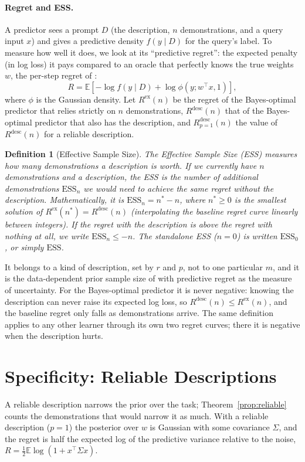 \documentclass{article}
\newtheorem{definition}{Definition}
\newcommand{\ess}{\mathrm{ESS}}
\newcommand{\E}{\mathbb{E}}
\begin{document}
\paragraph{Regret and ESS.}
A predictor sees a prompt $D$ (the description, $n$ demonstrations, and a query input $x$) and gives a predictive density $f(y \mid D)$ for the query's label. To measure how well it does, we look at its ``predictive regret'': the expected penalty (in log loss) it pays compared to an oracle that perfectly knows the true weights $w$, the per-step regret of \citet{genewein2025}:
\begin{equation}\label{eq:regret}
    R = \E \left[ -\log f(y \mid D) + \log \phi(y; w^\top x, 1) \right],
\end{equation}
where $\phi$ is the Gaussian density. Let $R^{\mathrm{ex}}(n)$ be the regret of the Bayes-optimal predictor that relies strictly on $n$ demonstrations, $R^{\mathrm{desc}}(n)$ that of the Bayes-optimal predictor that also has the description, and $R^{\mathrm{desc}}_{p=1}(n)$ the value of $R^{\mathrm{desc}}(n)$ for a reliable description.
\begin{definition}[Effective Sample Size]\label{def:ess}
The Effective Sample Size (ESS) measures how many demonstrations a description is worth. If we currently have $n$ demonstrations and a description, the ESS is the number of additional demonstrations $\ess_n$ we would need to achieve the same regret without the description. Mathematically, it is $\ess_n = n^* - n$, where $n^* \ge 0$ is the smallest solution of $R^{\mathrm{ex}}(n^*) = R^{\mathrm{desc}}(n)$ (interpolating the baseline regret curve linearly between integers). If the regret with the description is above the regret with nothing at all, we write $\ess_n \le -n$. The standalone ESS ($n=0$) is written $\ess_0$, or simply $\ess$.
\end{definition}
It belongs to a kind of description, set by $r$ and $p$, not to one particular $m$, and it is the data-dependent prior sample size of \citet{reimherr2021} with predictive regret as the measure of uncertainty. For the Bayes-optimal predictor it is never negative: knowing the description can never raise its expected log loss, so $R^{\mathrm{desc}}(n) \le R^{\mathrm{ex}}(n)$, and the baseline regret only falls as demonstrations arrive. The same definition applies to any other learner through its own two regret curves; there it is negative when the description hurts.

\section{Specificity: Reliable Descriptions}\label{sec:specificity}
A reliable description narrows the prior over the task; Theorem~\ref{prop:reliable} counts the demonstrations that would narrow it as much. With a reliable description ($p = 1$) the posterior over $w$ is Gaussian with some covariance $\Sigma$, and the regret is half the expected log of the predictive variance relative to the noise, $R = \tfrac12 \E \log(1 + x^\top \Sigma x)$.
\end{document}
